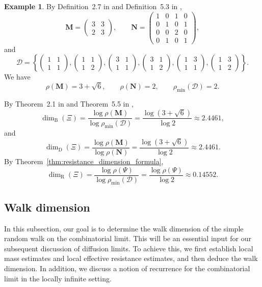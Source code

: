 \documentclass{article}
\theoremstyle{plain}
\theoremstyle{definition}
\newtheorem{example}[theorem]{Example}
\newcommand{\dimbox}{\dim_\mathrm{B}}
\newcommand{\dimdeg}{\dim_\mathrm{D}}
\newcommand{\dimresis}{\dim_\mathrm{R}}
\begin{document}
\begin{example}
By Definition~2.7 in \cite{neroli2024fractal} and Definition~5.3 in \cite{li2024on},
\[
\mathbf M=
\begin{pmatrix}
3 & 3\\
2 & 3
\end{pmatrix},
\qquad
\mathbf N=
\begin{pmatrix}
1&0&1&0\\
0&1&0&1\\
0&0&2&0\\
0&1&0&1
\end{pmatrix},
\]
and
\[
\mathcal D=
\left\{
\begin{pmatrix}1&1\\ 1&1\end{pmatrix},
\begin{pmatrix}1&1\\ 1&2\end{pmatrix},
\begin{pmatrix}3&1\\ 1&1\end{pmatrix},
\begin{pmatrix}3&1\\ 1&2\end{pmatrix},
\begin{pmatrix}1&3\\ 1&1\end{pmatrix},
\begin{pmatrix}1&3\\ 1&2\end{pmatrix}
\right\}.
\]
We have
\[
\rho(\mathbf M)=3+\sqrt{6},
\qquad
\rho(\mathbf N)=2,
\qquad
\rho_{\min}(\mathcal D)=2.
\]

By Theorem~2.1 in \cite{neroli2024fractal} and Theorem~5.5 in \cite{li2024on},
\[
\dimbox(\Xi)
=
\frac{\log\rho(\mathbf M)}{\log\rho_{\min}(\mathcal D)}
=
\frac{\log(3+\sqrt{6})}{\log 2}
\approx 2.4461,
\]
and
\[
\dimdeg(\Xi)
=
\frac{\log\rho(\mathbf M)}{\log\rho(\mathbf N)}
=
\frac{\log(3+\sqrt{6})}{\log 2}
\approx 2.4461.
\]
By Theorem~\ref{thm:resistance_dimension_formula},
\[
\dimresis(\Xi)
=
\frac{\log \rho(\Psi)}{\log \rho_{\min}(\mathcal D)}
=
\frac{\log\rho(\Psi)}{\log 2}
\approx 0.14552.
\]
\end{example}

\subsection{Walk dimension}\label{subsec:walk_dimension}

In this subsection, our goal is to determine the walk dimension of the simple random walk on the combinatorial limit.
This will be an essential input for our subsequent discussion of diffusion limits.
To achieve this, we first establish local mass estimates and local effective resistance estimates, and then deduce the walk dimension.
In addition, we discuss a notion of recurrence for the combinatorial limit in the locally infinite setting.
\end{document}
